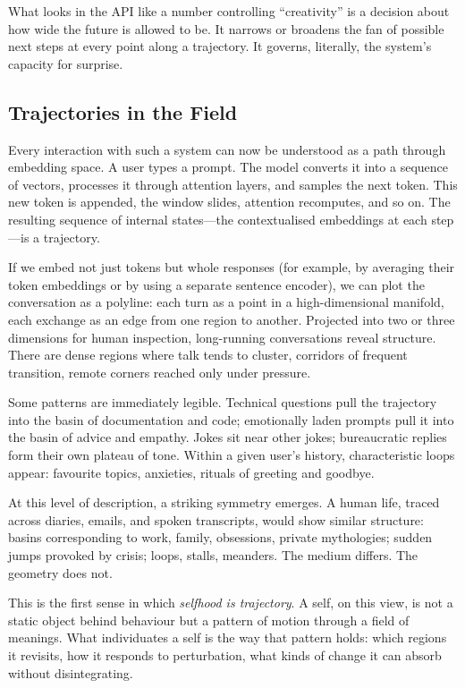\documentclass[12pt,a4paper]{report}
\begin{document}
What looks in the API like a number controlling ``creativity'' is a decision about how wide the future is allowed to be. It narrows or broadens the fan of possible next steps at every point along a trajectory. It governs, literally, the system's capacity for surprise.

\subsection*{Trajectories in the Field}

Every interaction with such a system can now be understood as a path through embedding space. A user types a prompt. The model converts it into a sequence of vectors, processes it through attention layers, and samples the next token. This new token is appended, the window slides, attention recomputes, and so on. The resulting sequence of internal states---the contextualised embeddings at each step---is a trajectory.

If we embed not just tokens but whole responses (for example, by averaging their token embeddings or by using a separate sentence encoder), we can plot the conversation as a polyline: each turn as a point in a high-dimensional manifold, each exchange as an edge from one region to another. Projected into two or three dimensions for human inspection, long-running conversations reveal structure. There are dense regions where talk tends to cluster, corridors of frequent transition, remote corners reached only under pressure.

Some patterns are immediately legible. Technical questions pull the trajectory into the basin of documentation and code; emotionally laden prompts pull it into the basin of advice and empathy. Jokes sit near other jokes; bureaucratic replies form their own plateau of tone. Within a given user's history, characteristic loops appear: favourite topics, anxieties, rituals of greeting and goodbye.

At this level of description, a striking symmetry emerges. A human life, traced across diaries, emails, and spoken transcripts, would show similar structure: basins corresponding to work, family, obsessions, private mythologies; sudden jumps provoked by crisis; loops, stalls, meanders. The medium differs. The geometry does not.

This is the first sense in which \emph{selfhood is trajectory}. A self, on this view, is not a static object behind behaviour but a pattern of motion through a field of meanings. What individuates a self is the way that pattern holds: which regions it revisits, how it responds to perturbation, what kinds of change it can absorb without disintegrating.
\end{document}
